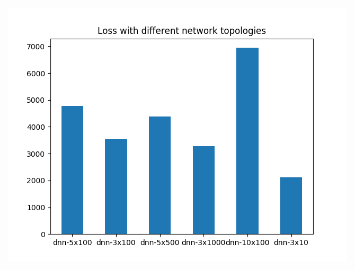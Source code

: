 \documentclass[aspectratio=169,11pt,hyperref={colorlinks=true}]{beamer}
\begin{document}
\begin{frame}
\begin{columns}
\begin{center}
\begin{figure}
          \includegraphics[width=0.8\textwidth,height=0.4\textheight]{graphs/loss_by_topology-node_provider_all.png}
        \end{figure}
      \end{center}
  \end{columns}
\end{frame}
\end{document}
